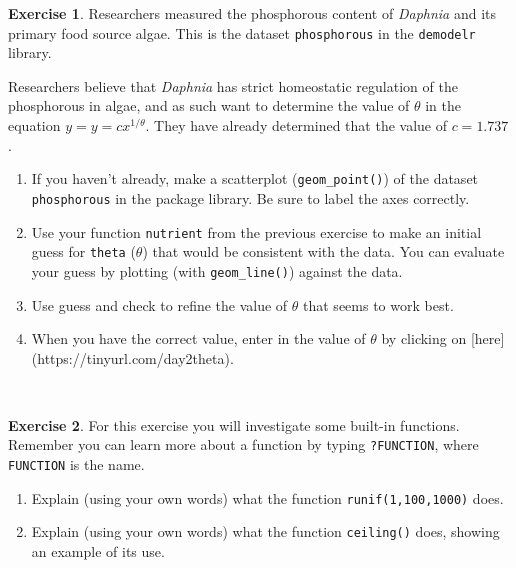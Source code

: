 \documentclass[
]{book}
\theoremstyle{definition}
\theoremstyle{definition}
\theoremstyle{definition}
\newtheorem{exercise}{Exercise}[chapter]
\theoremstyle{remark}
\begin{document}
\begin{exercise}
\protect\hypertarget{exr:unnamed-chunk-46}{}{\label{exr:unnamed-chunk-46} }Researchers measured the phosphorous content of \emph{Daphnia} and its primary food source algae. This is the dataset \texttt{phosphorous} in the \texttt{demodelr} library.

Researchers believe that \emph{Daphnia} has strict homeostatic regulation of the phosphorous in algae, and as such want to determine the value of \(\theta\) in the equation \(y= \displaystyle y = c x^{1/\theta}\). They have already determined that the value of \(c=1.737\).

\begin{enumerate}[label=\alph*.]
\item If you haven't already, make a scatterplot (\texttt{geom\_point()}) of the dataset \texttt{phosphorous} in the package library. Be sure to label the axes correctly.
\item Use your function \texttt{nutrient} from the previous exercise to make an initial guess for \texttt{theta} ($\theta$) that would be consistent with the data.  You can evaluate your guess by plotting (with \texttt{geom\_line()}) against the data.
\item Use guess and check to refine the value of $\theta$ that seems to work best.
\item When you have the correct value, enter in the value of $\theta$ by clicking on [here](https://tinyurl.com/day2theta).
\end{enumerate}
\end{exercise}

~

\begin{exercise}
\protect\hypertarget{exr:unnamed-chunk-47}{}{\label{exr:unnamed-chunk-47} }For this exercise you will investigate some built-in functions. Remember you can learn more about a function by typing \texttt{?FUNCTION}, where \texttt{FUNCTION} is the name.

\begin{enumerate}[label=\alph*.]
\item Explain (using your own words) what the function \texttt{runif(1,100,1000)} does.
\item Explain (using your own words) what the function \texttt{ceiling()} does, showing an example of its use.
\end{enumerate}
\end{exercise}
\end{document}

